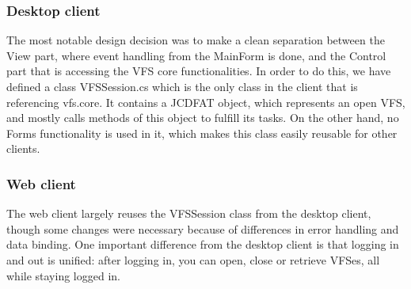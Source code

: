 \documentclass[a4paper,12pt]{article}
\begin{document}
\subsubsection{Desktop client}
The most notable design decision was to make a clean separation between the View part, where event handling from the MainForm is done, and the Control part that is accessing the VFS core functionalities. In order to do this, we have defined a class VFSSession.cs which is the only class in the client that is referencing vfs.core. It contains a JCDFAT object, which represents an open VFS, and mostly calls methods of this object to fulfill its tasks. On the other hand, no Forms functionality is used in it, which makes this class easily reusable for other clients.

\subsubsection{Web client}

The web client largely reuses the VFSSession class from the desktop client, though some changes were necessary because of differences in error handling and data binding. One important difference from the desktop client is that logging in and out is unified: after logging in, you can open, close or retrieve VFSes, all while staying logged in.
\end{document}
